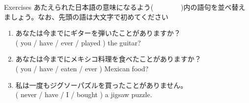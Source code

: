 \documentclass[aspectratio=169,xcolor={dvipsnames,table}]{beamer}
\newcommand{\myaudio}[1]{\href{#1}{\faVolumeUp}}
\begin{document}
\begin{frame}[plain]{Exercises}
あたえられた日本語の意味になるよう(~~~~~~~~)内の語句を並べ替えましょう。なお、先頭の語は大文字で初めてください\mbox{}\hfill{\scriptsize \myaudio{./audio/013_have_pp_keiken_05.mp3}}

\vspace{-10pt}
 \begin{enumerate}
  \item あなたは今までにギターを弾いたことがありますか？\\
( you / have / ever / played ) the guitar?\\
\vspace{-10pt}
  \item あなたは今までにメキシコ料理を食べたことがありますか？\hfill{}\,\,\\
( you / have / eaten / ever ) Mexican food?\\
  \item 私は一度もジグソーパズルを買ったことがありません。\\
( never / have / I / bought ) a jigsaw puzzle.\\
 \end{enumerate}

\vspace{-65pt}

\mbox{}\hfill{}
\end{frame}
\end{document}
